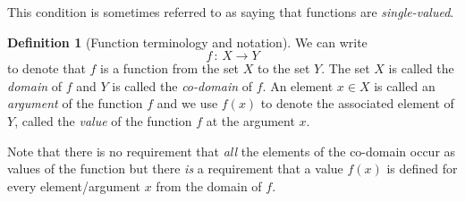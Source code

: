 \documentclass[extrafontsizes, twoside, a4paper]{memoir}
\theoremstyle{plain}%
\theoremstyle{definition}
\newtheorem{defn}{Definition}[chapter]
\theoremstyle{remark}
\begin{document}
This condition is sometimes referred to as saying that functions are \textit{single-valued}.

\begin{defn}[Function terminology and notation]
We can write
$$f \, : \, X \to Y $$
to denote that $f$ is a function from the set $X$ to the set $Y$. The set $X$ is called the \emph{domain} of $f$ and $Y$ is called the \emph{co-domain} of $f$. An element $x \in X$ is called an \emph{argument} of the function $f$ and we use $f(x)$ to denote the associated element of $Y$, called the \emph{value} of the function $f$ at the argument $x$.
\end{defn}
Note that there is no requirement that \textit{all} the elements of the co-domain occur as values of the function but there \textit{is} a requirement that a value $f(x)$ is defined for every element/argument $x$ from the domain of $f$.
\end{document}

